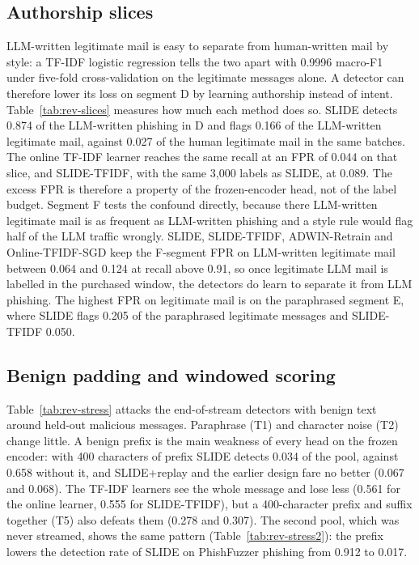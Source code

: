 

\subsection{Authorship slices}\label{sec:slices}
LLM-written legitimate mail is easy to separate from human-written mail by style: a TF-IDF logistic regression tells the two apart with 0.9996 macro-F1 under five-fold cross-validation on the legitimate messages alone. A detector can therefore lower its loss on segment D by learning authorship instead of intent. Table~\ref{tab:rev-slices} measures how much each method does so. SLIDE detects 0.874 of the LLM-written phishing in D and flags 0.166 of the LLM-written legitimate mail, against 0.027 of the human legitimate mail in the same batches. The online TF-IDF learner reaches the same recall at an FPR of 0.044 on that slice, and SLIDE-TFIDF, with the same 3{,}000 labels as SLIDE, at 0.089. The excess FPR is therefore a property of the frozen-encoder head, not of the label budget. Segment F tests the confound directly, because there LLM-written legitimate mail is as frequent as LLM-written phishing and a style rule would flag half of the LLM traffic wrongly. SLIDE, SLIDE-TFIDF, ADWIN-Retrain and Online-TFIDF-SGD keep the F-segment FPR on LLM-written legitimate mail between 0.064 and 0.124 at recall above 0.91, so once legitimate LLM mail is labelled in the purchased window, the detectors do learn to separate it from LLM phishing. The highest FPR on legitimate mail is on the paraphrased segment E, where SLIDE flags 0.205 of the paraphrased legitimate messages and SLIDE-TFIDF 0.050.



\subsection{Benign padding and windowed scoring}\label{sec:stress}
Table~\ref{tab:rev-stress} attacks the end-of-stream detectors with benign text around held-out malicious messages. Paraphrase (T1) and character noise (T2) change little. A benign prefix is the main weakness of every head on the frozen encoder: with 400 characters of prefix SLIDE detects 0.034 of the pool, against 0.658 without it, and SLIDE+replay and the earlier design fare no better (0.067 and 0.068). The TF-IDF learners see the whole message and lose less (0.561 for the online learner, 0.555 for SLIDE-TFIDF), but a 400-character prefix and suffix together (T5) also defeats them (0.278 and 0.307). The second pool, which was never streamed, shows the same pattern (Table~\ref{tab:rev-stress2}): the prefix lowers the detection rate of SLIDE on PhishFuzzer phishing from 0.912 to 0.017.

